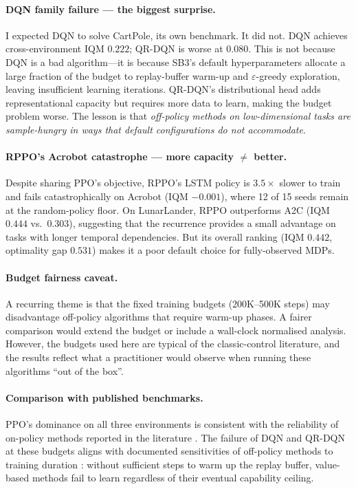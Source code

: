 \paragraph{DQN family failure --- the biggest surprise.}
I expected DQN to solve CartPole, its own benchmark. It did not.
DQN achieves cross-environment IQM $0.222$; QR-DQN is worse at $0.080$.
This is not because DQN is a bad algorithm---it is because SB3's default
hyperparameters allocate a large fraction of the budget to replay-buffer
warm-up and $\varepsilon$-greedy exploration, leaving insufficient
learning iterations. QR-DQN's distributional head adds representational
capacity but requires more data to learn, making the budget problem
worse. The lesson is that \emph{off-policy methods on low-dimensional
tasks are sample-hungry in ways that default configurations do not
accommodate}.

\paragraph{RPPO's Acrobot catastrophe --- more capacity $\neq$ better.}
Despite sharing PPO's objective, RPPO's LSTM policy is $3.5\times$
slower to train and fails catastrophically on Acrobot (IQM $-0.001$),
where 12 of 15 seeds remain at the random-policy floor. On LunarLander,
RPPO outperforms A2C (IQM $0.444$ vs.\ $0.303$), suggesting that the
recurrence provides a small advantage on tasks with longer temporal
dependencies. But its overall ranking (IQM $0.442$, optimality gap
$0.531$) makes it a poor default choice for fully-observed MDPs.

\paragraph{Budget fairness caveat.}
A recurring theme is that the fixed training budgets (200K--500K steps)
may disadvantage off-policy algorithms that require warm-up phases.
A fairer comparison would extend the budget or include a wall-clock
normalised analysis. However, the budgets used here are typical of
the classic-control literature, and the results reflect what a
practitioner would observe when running these algorithms
``out of the box''.

{\color{red} \paragraph{Comparison with published benchmarks.}
PPO's dominance on all three environments is consistent with the reliability of on-policy methods reported in the literature \citep{schulman2017ppo}. The failure of DQN and QR-DQN at these budgets aligns with documented sensitivities of off-policy methods to training duration \citep{henderson2018matters}: without sufficient steps to warm up the replay buffer, value-based methods fail to learn regardless of their eventual capability ceiling.}

